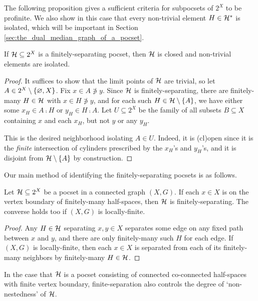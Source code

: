\documentclass[reqno]{amsart}
\begin{document}
    The following proposition gives a sufficient criteria for subpocsets of $2^X$ to be profinite. We also show in this case that every non-trivial element $H\in\mathcal{H}^\ast$ is isolated, which will be important in Section \ref{sec:the_dual_median_graph_of_a_pocset}.

    \begin{lemma}\label{lem:finitely-separating_non-trivial_isolated}
        If $\mathcal{H}\subseteq2^X$ is a finitely-separating pocset, then $\mathcal{H}$ is closed and non-trivial elements are isolated.
    \end{lemma}
    \begin{proof}
        It suffices to show that the limit points of $\mathcal{H}$ are trivial, so let $A\in2^X\setminus\left\{\varnothing,X\right\}$. Fix $x\in A\not\ni y$. Since $\mathcal{H}$ is finitely-separating, there are finitely-many $H\in\mathcal{H}$ with $x\in H\not\ni y$, and for each such $H\in\mathcal{H}\setminus\left\{A\right\}$, we have either some $x_H\in A\comp H$ or $y_H\in H\comp A$. Let $U\subseteq2^X$ be the family of all subsets $B\subseteq X$ containing $x$ and each $x_H$, but not $y$ or any $y_H$.

        This is the desired neighborhood isolating $A\in U$. Indeed, it is (cl)open since it is the \textit{finite} intersection of cylinders prescribed by the $x_H$'s and $y_H$'s, and it is disjoint from $\mathcal{H}\setminus\left\{A\right\}$ by construction.
    \end{proof}

    Our main method of identifying the finitely-separating pocsets is as follows.

    \begin{lemma}\label{lem:finitely_separating_iff_on_boundary_of_finite}
        Let $\mathcal{H}\subseteq2^X$ be a pocset in a connected graph $(X,G)$. If each $x\in X$ is on the vertex boundary of finitely-many half-spaces, then $\mathcal{H}$ is finitely-separating. The converse holds too if $(X,G)$ is locally-finite.
    \end{lemma}
    \begin{proof}
        Any $H\in\mathcal{H}$ separating $x,y\in X$ separates some edge on any fixed path between $x$ and $y$, and there are only finitely-many such $H$ for each edge. If $(X,G)$ is locally-finite, then each $x\in X$ is separated from each of its finitely-many neighbors by finitely-many $H\in\mathcal{H}$.
    \end{proof}

    In the case that $\mathcal{H}$ is a pocset consisting of connected co-connected half-spaces with finite vertex boundary, finite-separation also controls the degree of `non-nestedness' of $\mathcal{H}$.
\end{document}
